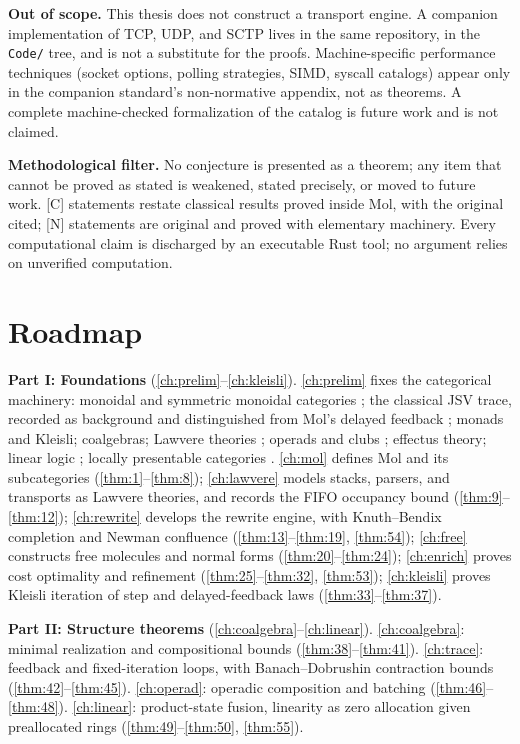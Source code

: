 \textbf{Out of scope.} This thesis does not construct a transport engine. A companion implementation of TCP, UDP, and SCTP lives in the same repository, in the \texttt{Code/} tree, and is not a substitute for the proofs. Machine-specific performance techniques (socket options, polling strategies, SIMD, syscall catalogs) appear only in the companion standard's non-normative appendix, not as theorems. A complete machine-checked formalization of the catalog is future work and is not claimed.

\textbf{Methodological filter.} No conjecture is presented as a theorem; any item that cannot be proved as stated is weakened, stated precisely, or moved to future work. [C] statements restate classical results proved inside Mol, with the original cited; [N] statements are original and proved with elementary machinery. Every computational claim is discharged by an executable Rust tool; no argument relies on unverified computation.

\section{Roadmap}
\label{sec:roadmap}

\textbf{Part I: Foundations} (\autoref{ch:prelim}--\autoref{ch:kleisli}). \autoref{ch:prelim} fixes the categorical machinery: monoidal and symmetric monoidal categories \citep{maclane}; the classical JSV trace, recorded as background and distinguished from Mol's delayed feedback \citep{joyalsv}; monads and Kleisli; coalgebras; Lawvere theories \citep{lawvere}; operads and clubs \citep{leinster,kelly}; effectus theory; linear logic \citep{girard}; locally presentable categories \citep{adamek}. \autoref{ch:mol} defines Mol and its subcategories (\autoref{thm:1}--\autoref{thm:8}); \autoref{ch:lawvere} models stacks, parsers, and transports as Lawvere theories, and records the FIFO occupancy bound (\autoref{thm:9}--\autoref{thm:12}); \autoref{ch:rewrite} develops the rewrite engine, with Knuth--Bendix completion \citep{knuthbendix} and Newman confluence \citep{newman} (\autoref{thm:13}--\autoref{thm:19}, \autoref{thm:54}); \autoref{ch:free} constructs free molecules and normal forms (\autoref{thm:20}--\autoref{thm:24}); \autoref{ch:enrich} proves cost optimality and refinement (\autoref{thm:25}--\autoref{thm:32}, \autoref{thm:53}); \autoref{ch:kleisli} proves Kleisli iteration of step and delayed-feedback laws (\autoref{thm:33}--\autoref{thm:37}).

\textbf{Part II: Structure theorems} (\autoref{ch:coalgebra}--\autoref{ch:linear}). \autoref{ch:coalgebra}: minimal realization and compositional bounds \citep{nerode,hopcroft} (\autoref{thm:38}--\autoref{thm:41}). \autoref{ch:trace}: feedback and fixed-iteration loops, with Banach--Dobrushin contraction bounds \citep{banach,dobroushin} (\autoref{thm:42}--\autoref{thm:45}). \autoref{ch:operad}: operadic composition and batching (\autoref{thm:46}--\autoref{thm:48}). \autoref{ch:linear}: product-state fusion, linearity as zero allocation given preallocated rings (\autoref{thm:49}--\autoref{thm:50}, \autoref{thm:55}).

